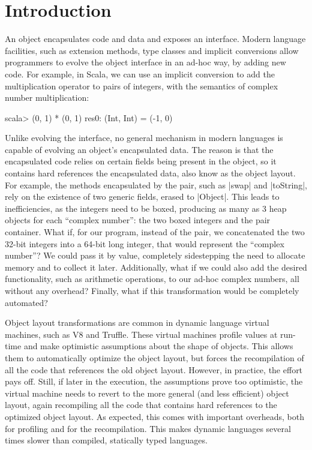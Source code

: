 \section{Introduction}
\label{sec:intro}

An object encapsulates code and data and exposes an interface. Modern
language facilities, such as extension methods, type classes and
implicit conversions allow programmers to evolve the object interface
in an ad-hoc way, by adding new code. For example, in Scala, we can
use an implicit conversion to add the multiplication operator to pairs
of integers, with the semantics of complex number multiplication:

\begin{lstlisting-nobreak}
scala> (0, 1) * (0, 1)
res0: (Int, Int) = (-1, 0)
\end{lstlisting-nobreak}

Unlike evolving the interface, no general mechanism in modern languages
is capable of evolving an object's encapsulated data. The
reason is that the encapsulated code relies on certain fields being
present in the object, so it contains hard references the encapsulated data, also know as the object
layout. For example, the methods encapsulated by the pair, such as
|swap| and |toString|, rely on the existence of two generic fields,
erased to |Object|. This leads to inefficiencies, as the integers need
to be boxed, producing as many as 3 heap objects for each ``complex
number'': the two boxed integers and the pair container. What if, for our program,
instead of the pair, we concatenated the two 32-bit integers into a
64-bit long integer, that would represent the ``complex
number''? We could pass it by value, completely sidestepping the need
to allocate memory and to collect it later. Additionally, what if we
could also add the desired functionality, such as arithmetic
operations, to our ad-hoc complex numbers, all without any overhead?
Finally, what if this transformation would be completely automated?

Object layout transformations are common in dynamic language virtual machines, such as V8 and Truffle. These virtual machines profile values at run-time and make optimistic assumptions about the shape of objects. This allows them to automatically optimize the object layout, but forces the recompilation of all the code that references the old object layout. However, in practice, the effort pays off. Still, if later in the execution, the assumptions prove too optimistic, the virtual machine needs to revert to the more general (and less efficient) object layout, again recompiling all the code that contains hard references to the optimized object layout. As expected, this comes with important overheads, both for profiling and for the recompilation. This makes dynamic languages several times slower than compiled, statically typed languages.

